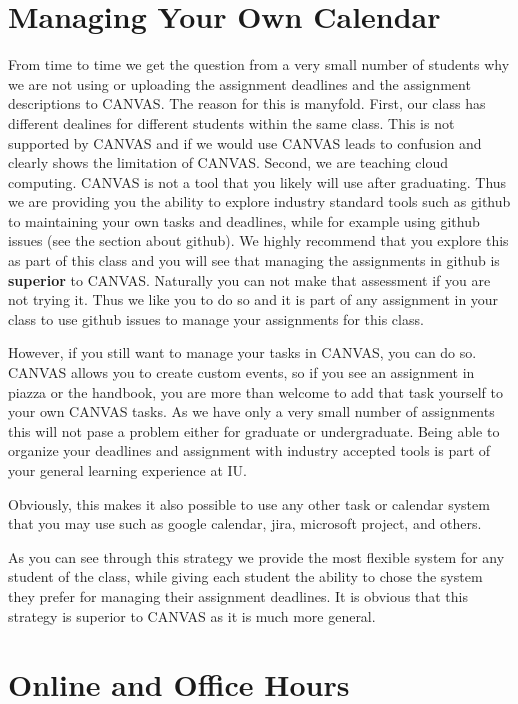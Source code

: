 \section{Managing Your Own Calendar}
\label{s:manage-calendar}

From time to time we get the question from a very small number of
students why we are not using or uploading the assignment deadlines
and the assignment descriptions to CANVAS. The reason for this is
manyfold. First, our class has different dealines for different
students within the same class. This is not supported by CANVAS and if
we would use CANVAS leads to confusion and clearly shows the
limitation of CANVAS. Second, we are teaching cloud computing. CANVAS
is not a tool that you likely will use after graduating. Thus we are
providing you the ability to explore industry standard tools such as
github to maintaining your own tasks and deadlines, while for example
using github issues (see the section about github). We highly
recommend that you explore this as part of this class and you will see
that managing the assignments in github is {\bf superior} to
CANVAS. Naturally you can not make that assessment if you are not
trying it. Thus we like you to do so and it is part of any assignment
in your class to use github issues to manage your assignments for this
class.

However, if you still want to manage your tasks in CANVAS, you can do
so. CANVAS allows you to create custom events, so if you see an
assignment in piazza or the handbook, you are more than welcome to add
that task yourself to your own CANVAS tasks. As we have only a very
small number of assignments this will not pase a problem either for
graduate or undergraduate. Being able to organize your deadlines and
assignment with industry accepted tools is part of your general
learning experience at IU.

Obviously, this makes it also possible to use any other task or
calendar system that you may use such as google calendar, jira,
microsoft project, and others.

As you can see through this strategy we provide the most flexible
system for any student of the class, while giving each student the
ability to chose the system they prefer for managing their assignment
deadlines. It is obvious that this strategy is superior to CANVAS as
it is much more general.


\section{Online  and Office Hours}

